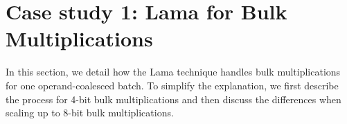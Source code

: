 







\section{Case study 1: Lama for Bulk Multiplications}
In this section, we detail how the Lama technique handles bulk multiplications for one operand-coalesced batch. To simplify the explanation, we first describe the process for 4-bit bulk multiplications and then discuss the differences when scaling up to 8-bit bulk multiplications.

